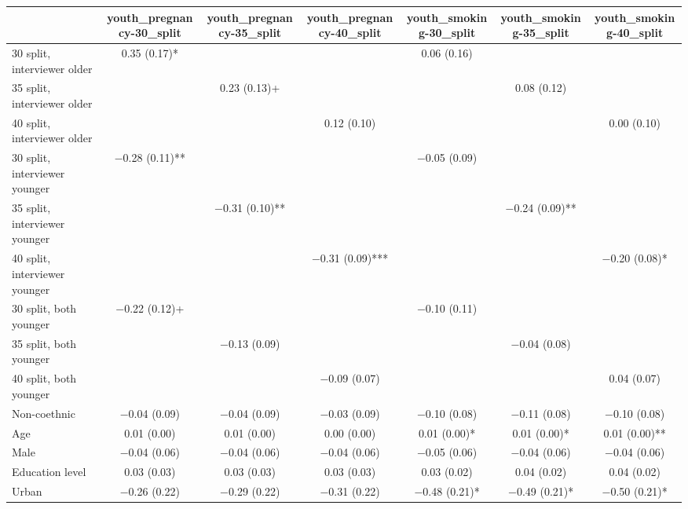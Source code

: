 \begin{table}
\centering
\begin{tabular}[t]{lcccccc}
\toprule
  & youth\_pregnancy-30\_split & youth\_pregnancy-35\_split & youth\_pregnancy-40\_split & youth\_smoking-30\_split & youth\_smoking-35\_split & youth\_smoking-40\_split\\
\midrule
30 split, interviewer older & \num{0.35} (\num{0.17})* &  &  & \num{0.06} (\num{0.16}) &  & \\
35 split, interviewer older &  & \num{0.23} (\num{0.13})+ &  &  & \num{0.08} (\num{0.12}) & \\
40 split, interviewer older &  &  & \num{0.12} (\num{0.10}) &  &  & \num{0.00} (\num{0.10})\\
30 split, interviewer younger & \num{-0.28} (\num{0.11})** &  &  & \num{-0.05} (\num{0.09}) &  & \\
35 split, interviewer younger &  & \num{-0.31} (\num{0.10})** &  &  & \num{-0.24} (\num{0.09})** & \\
40 split, interviewer younger &  &  & \num{-0.31} (\num{0.09})*** &  &  & \num{-0.20} (\num{0.08})*\\
30 split, both younger & \num{-0.22} (\num{0.12})+ &  &  & \num{-0.10} (\num{0.11}) &  & \\
35 split, both younger &  & \num{-0.13} (\num{0.09}) &  &  & \num{-0.04} (\num{0.08}) & \\
40 split, both younger &  &  & \num{-0.09} (\num{0.07}) &  &  & \num{0.04} (\num{0.07})\\
Non-coethnic & \num{-0.04} (\num{0.09}) & \num{-0.04} (\num{0.09}) & \num{-0.03} (\num{0.09}) & \num{-0.10} (\num{0.08}) & \num{-0.11} (\num{0.08}) & \num{-0.10} (\num{0.08})\\
Age & \num{0.01} (\num{0.00}) & \num{0.01} (\num{0.00}) & \num{0.00} (\num{0.00}) & \num{0.01} (\num{0.00})* & \num{0.01} (\num{0.00})* & \num{0.01} (\num{0.00})**\\
Male & \num{-0.04} (\num{0.06}) & \num{-0.04} (\num{0.06}) & \num{-0.04} (\num{0.06}) & \num{-0.05} (\num{0.06}) & \num{-0.04} (\num{0.06}) & \num{-0.04} (\num{0.06})\\
Education level & \num{0.03} (\num{0.03}) & \num{0.03} (\num{0.03}) & \num{0.03} (\num{0.03}) & \num{0.03} (\num{0.02}) & \num{0.04} (\num{0.02}) & \num{0.04} (\num{0.02})\\
Urban & \num{-0.26} (\num{0.22}) & \num{-0.29} (\num{0.22}) & \num{-0.31} (\num{0.22}) & \num{-0.48} (\num{0.21})* & \num{-0.49} (\num{0.21})* & \num{-0.50} (\num{0.21})*\\

\end{tabular}
\end{table}
